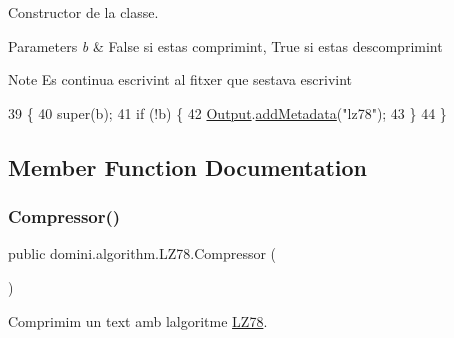Constructor de la classe. 


\begin{DoxyParams}{Parameters}
{\em b} & False si estas comprimint, True si estas descomprimint \\
\hline
\end{DoxyParams}
\begin{DoxyNote}{Note}
Es continua escrivint al fitxer que s\textquotesingle{}estava escrivint 
\end{DoxyNote}

\begin{DoxyCode}
39                            \{
40         super(b);
41         \textcolor{keywordflow}{if} (!b) \{
42             \hyperlink{classdomini_1_1algorithm_1_1Algorithm_a4de9955411c656325adc391ef570c082}{Output}.\hyperlink{classpersistencia_1_1output_1_1Ctrl__Output_ae6d6857910a023982900ddc857b891f0}{addMetadata}(\textcolor{stringliteral}{"lz78"});
43         \}
44     \}
\end{DoxyCode}


\subsection{Member Function Documentation}
\mbox{\label{classdomini_1_1algorithm_1_1LZ78_a6ce2ce6b2ce14cbe5177f379becbb2d1}} 
\subsubsection{\texorpdfstring{Compressor()}{Compressor()}}
{\footnotesize\ttfamily public domini.\+algorithm.\+L\+Z78.\+Compressor (\begin{DoxyParamCaption}{ }\end{DoxyParamCaption})\hspace{0.3cm}{\ttfamily [inline]}}



Comprimim un text amb l\textquotesingle{}algoritme \hyperlink{classdomini_1_1algorithm_1_1LZ78}{L\+Z78}. 


